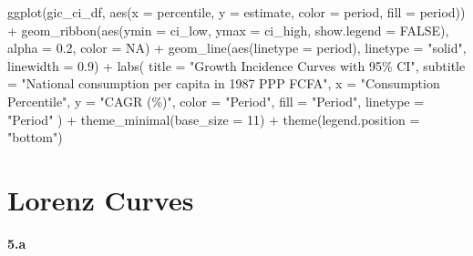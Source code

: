 \documentclass[
  letterpaper,
  DIV=11,
  numbers=noendperiod]{scrartcl}
\newenvironment{Shaded}{\begin{snugshade}}{\end{snugshade}}
\newcommand{\AttributeTok}[1]{\textcolor[rgb]{0.40,0.45,0.13}{#1}}
\newcommand{\ConstantTok}[1]{\textcolor[rgb]{0.56,0.35,0.01}{#1}}
\newcommand{\DecValTok}[1]{\textcolor[rgb]{0.68,0.00,0.00}{#1}}
\newcommand{\FloatTok}[1]{\textcolor[rgb]{0.68,0.00,0.00}{#1}}
\newcommand{\FunctionTok}[1]{\textcolor[rgb]{0.28,0.35,0.67}{#1}}
\newcommand{\NormalTok}[1]{\textcolor[rgb]{0.00,0.23,0.31}{#1}}
\newcommand{\SpecialCharTok}[1]{\textcolor[rgb]{0.37,0.37,0.37}{#1}}
\newcommand{\StringTok}[1]{\textcolor[rgb]{0.13,0.47,0.30}{#1}}
\begin{document}
\begin{Shaded}
\begin{Highlighting}[]
\FunctionTok{ggplot}\NormalTok{(gic\_ci\_df, }\FunctionTok{aes}\NormalTok{(}\AttributeTok{x =}\NormalTok{ percentile, }\AttributeTok{y =}\NormalTok{ estimate, }\AttributeTok{color =}\NormalTok{ period, }\AttributeTok{fill =}\NormalTok{ period)) }\SpecialCharTok{+}
  \FunctionTok{geom\_ribbon}\NormalTok{(}\FunctionTok{aes}\NormalTok{(}\AttributeTok{ymin =}\NormalTok{ ci\_low, }\AttributeTok{ymax =}\NormalTok{ ci\_high, }\AttributeTok{show.legend =} \ConstantTok{FALSE}\NormalTok{), }\AttributeTok{alpha =} \FloatTok{0.2}\NormalTok{, }\AttributeTok{color =} \ConstantTok{NA}\NormalTok{) }\SpecialCharTok{+}
  \FunctionTok{geom\_line}\NormalTok{(}\FunctionTok{aes}\NormalTok{(}\AttributeTok{linetype =}\NormalTok{ period), }\AttributeTok{linetype =} \StringTok{"solid"}\NormalTok{, }\AttributeTok{linewidth =} \FloatTok{0.9}\NormalTok{) }\SpecialCharTok{+}
  \FunctionTok{labs}\NormalTok{(}
    \AttributeTok{title =} \StringTok{"Growth Incidence Curves with 95\% CI"}\NormalTok{,}
    \AttributeTok{subtitle =} \StringTok{"National consumption per capita in 1987 PPP FCFA"}\NormalTok{,}
    \AttributeTok{x =} \StringTok{"Consumption Percentile"}\NormalTok{,}
    \AttributeTok{y =} \StringTok{"CAGR (\%)"}\NormalTok{,}
    \AttributeTok{color =} \StringTok{"Period"}\NormalTok{,}
    \AttributeTok{fill =} \StringTok{"Period"}\NormalTok{,}
    \AttributeTok{linetype =} \StringTok{"Period"}
\NormalTok{  ) }\SpecialCharTok{+}
  \FunctionTok{theme\_minimal}\NormalTok{(}\AttributeTok{base\_size =} \DecValTok{11}\NormalTok{) }\SpecialCharTok{+}
  \FunctionTok{theme}\NormalTok{(}\AttributeTok{legend.position =} \StringTok{"bottom"}\NormalTok{)}
\end{Highlighting}
\end{Shaded}

\section{Lorenz Curves}\label{lorenz-curves}

\textbf{5.a}
\end{document}

